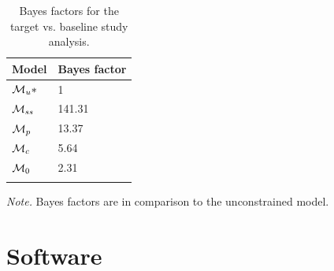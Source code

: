 \documentclass[english,,man]{apa6}
\begin{document}
\begin{table}[tbp]

\begin{center}
\begin{threeparttable}

\caption{\label{tab:ss-tab}Bayes factors for the target vs. baseline study analysis.}

\begin{tabular}{ll}
\toprule
Model & \multicolumn{1}{c}{Bayes factor}\\
\midrule
${\cal M}_{u}*$ & 1\\
${\cal M}_{ss}$ & 141.31\\
${\cal M}_{p}$ & 13.37\\
${\cal M}_{c}$ & 5.64\\
${\cal M}_{0}$ & 2.31\\
\bottomrule
\addlinespace
\end{tabular}

\begin{tablenotes}[para]
\normalsize{\textit{Note.} Bayes factors are in comparison to the unconstrained model.}
\end{tablenotes}

\end{threeparttable}
\end{center}

\end{table}

\hypertarget{software}{%
\section{Software}\label{software}}
\end{document}
